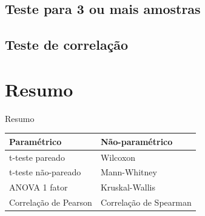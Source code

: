 \documentclass{beamer}
\begin{document}
\subsection[3+ amostras]{Teste para 3 ou mais amostras}

\subsection[Correlação]{Teste de correlação}

\section{Resumo}

\begin{frame}{Resumo}
  \begin{tabular}{||l||l||}
    \hline
    Paramétrico & Não-paramétrico\\
    \hline
    \hline
    t-teste pareado & Wilcoxon\\
    \hline
    t-teste não-pareado & Mann-Whitney\\
    \hline
    ANOVA 1 fator & Kruskal-Wallis\\
    \hline
    Correlação de Pearson & Correlação de Spearman\\
    \hline
  \end{tabular}

\end{frame}
\end{document}
